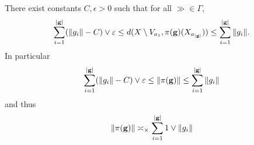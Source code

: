 \begin{lemma}
\label{lemmastrongseparation}
There exist constants $C,\epsilon > 0$ such that for all $\gg\in\Gamma$,
\begin{equation}
\label{quasiisometry1}
\sum_{i = 1}^{|\mathbf g|} (\|g_i\| - C) \vee \varepsilon \leq d(X\setminus V_{a_1},\pi(\mathbf g)(X_{a_{|\mathbf g|}})) \leq \sum_{i = 1}^{|\mathbf g|} \|g_i\|.
\end{equation}
In particular
\begin{equation}
\label{quasiisometry2}
\sum_{i = 1}^{|\mathbf g|} (\|g_i\| - C) \vee \varepsilon \leq \|\pi(\mathbf g)\| \leq \sum_{i = 1}^{|\mathbf g|} \|g_i\|
\end{equation}
and thus
\begin{equation}
\label{quasiisometry3}
\|\pi(\mathbf g)\| \asymp_\times \sum_{i = 1}^{|\mathbf g|} 1\vee\|g_i\|
\end{equation}
\end{lemma}

